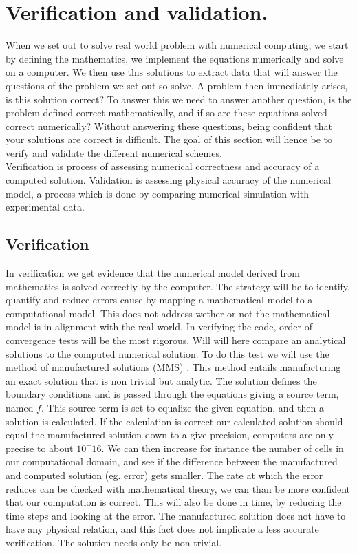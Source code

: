 \chapter{Verification and validation. }
When we set out to solve real world problem with numerical computing, we start by defining the mathematics, we implement the equations numerically and solve on a computer. We then use this solutions to extract data that will answer the questions of the problem we set out so solve. A problem then immediately arises, is this solution correct? To answer this we need to answer another question, is the problem defined correct mathematically, and if so are these equations solved correct numerically? Without answering these questions, being confident that your solutions are correct is difficult. \cite{Selin2014} The goal of this section will hence be to verify and validate the different numerical schemes. \\
Verification is process of assessing numerical correctness and accuracy of a computed solution. Validation is assessing physical accuracy of the numerical model, a process which is done by comparing numerical simulation with experimental data. 


\section{Verification}
In verification we get evidence that the numerical model derived from mathematics is solved correctly by the computer. The strategy will be to identify, quantify and reduce errors cause by mapping a mathematical model to a computational model. This does not address wether or not the mathematical model is in alignment with the real world. In verifying the code, order of convergence tests will be the most rigorous. Will will here compare an analytical solutions to the computed numerical solution. To do this test we will use the method of manufactured solutions (MMS) \cite{Roache2002}. This method entails manufacturing an exact solution that is non trivial but analytic. The solution defines the boundary conditions and is passed through the equations giving a source term, named $f$. This source term is set to equalize the given equation, and then a solution is calculated. If the calculation is correct our calculated solution should equal the manufactured solution down to a give precision, computers are only precise to about $10^-16$. We can then increase for instance the number of cells in our computational domain, and see if the difference between the manufactured and computed solution (eg. error) gets smaller. The rate at which the error reduces can be checked with mathematical theory, we can than be more confident that our computation is correct. This will also be done in time, by reducing the time steps and looking at the error. The manufactured solution does not have to have any physical relation, and this fact does not implicate a less accurate verification. The solution needs only be non-trivial.

